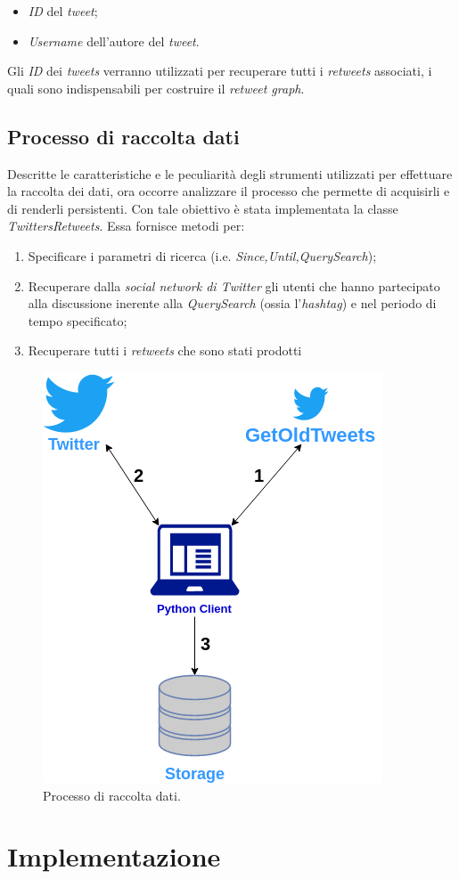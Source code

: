 \begin{itemize}
\item \textit{ID} del \textit{tweet};
\item \textit{Username} dell'autore del \textit{tweet}.
\end{itemize}
Gli \textit{ID} dei \textit{tweets} verranno utilizzati per recuperare tutti i \textit{retweets} associati, i quali sono indispensabili per costruire il \textit{retweet graph}.

\subsection{Processo di raccolta dati}
Descritte le caratteristiche e le peculiarità degli strumenti utilizzati per effettuare la raccolta dei dati, ora occorre analizzare il processo che permette di acquisirli e di renderli persistenti. Con tale obiettivo è stata implementata la classe \textit{TwittersRetweets}. Essa fornisce metodi per: 

\begin{enumerate}
\item Specificare i parametri di ricerca (i.e. \textit{Since,Until,QuerySearch}); 
\item Recuperare dalla \textit{social network di Twitter} gli utenti che hanno partecipato alla discussione inerente alla \textit{QuerySearch} (ossia l'\textit{hashtag}) e nel periodo di tempo specificato; 
\item Recuperare tutti i \textit{retweets} che sono stati prodotti 
\end{enumerate}

\begin{figure}
\begin{center}
\includegraphics[scale=0.6]{images/raccolta_dati_tesi.png}
\end{center}
\caption{Processo di raccolta dati.}
\label{fig:raccolta_dati}
\end{figure}


\section{Implementazione}
